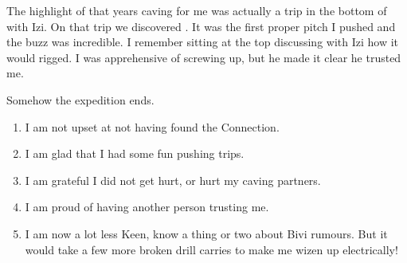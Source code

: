The highlight of that years caving for me was actually a trip in the
bottom of  with Izi. On that trip we discovered
. It was the first proper pitch I pushed and the
buzz was incredible. I remember sitting at the top discussing with Izi
how it would rigged. I was apprehensive of screwing up, but he made it
clear he trusted me.

Somehow the expedition ends.

\begin{enumerate}
\def\labelenumi{\arabic{enumi}.}
\item
  I am not upset at not having found the Connection.
\item
  I am glad that I had some fun pushing trips.
\item
  I am grateful I did not get hurt, or hurt my caving partners.
\item
  I am proud of having another person trusting me.
\item
  I am now a lot less Keen, know a thing or two about Bivi rumours. But
  it would take a few more broken drill carries to make me wizen up
  electrically!
\end{enumerate}

